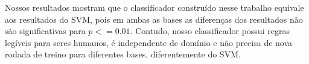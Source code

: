 \documentclass[template.tex]{subfiles}
\begin{document}
%
%
%

Nossos resultados mostram que o classificador construído nesse trabalho equivale aos resultados do SVM, pois em ambas as bases as diferenças dos resultados não são significativas para $p <= 0.01$. Contudo, nosso classificador possui regras legíveis para seres humanos, é independente de domínio e não precisa de nova rodada de treino para diferentes bases, diferentemente do SVM.

\end{document}
